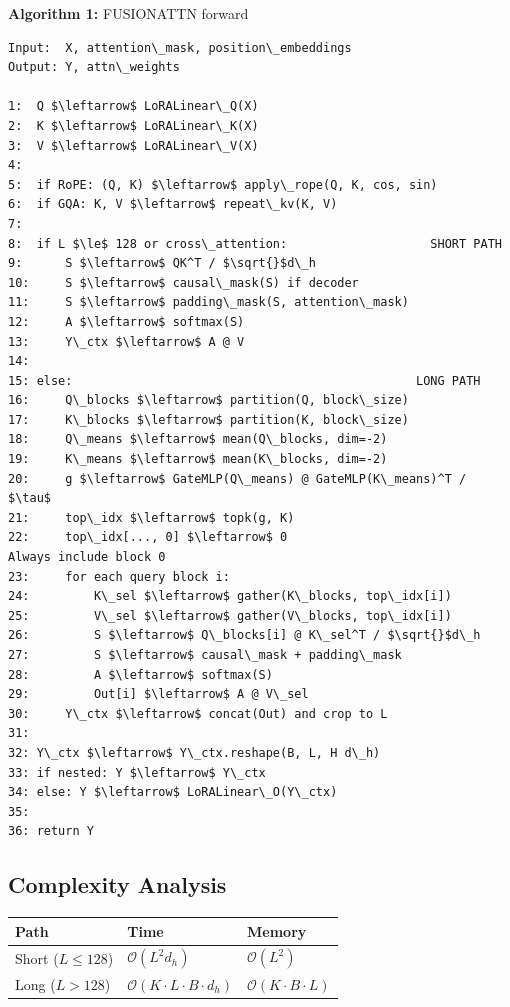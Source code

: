 \textbf{Algorithm 1:} FUSIONATTN forward
\begin{lstlisting}
Input:  X, attention\_mask, position\_embeddings
Output: Y, attn\_weights

1:  Q $\leftarrow$ LoRALinear\_Q(X)
2:  K $\leftarrow$ LoRALinear\_K(X)
3:  V $\leftarrow$ LoRALinear\_V(X)
4:
5:  if RoPE: (Q, K) $\leftarrow$ apply\_rope(Q, K, cos, sin)
6:  if GQA: K, V $\leftarrow$ repeat\_kv(K, V)
7:
8:  if L $\le$ 128 or cross\_attention:                    SHORT PATH
9:      S $\leftarrow$ QK^T / $\sqrt{}$d\_h
10:     S $\leftarrow$ causal\_mask(S) if decoder
11:     S $\leftarrow$ padding\_mask(S, attention\_mask)
12:     A $\leftarrow$ softmax(S)
13:     Y\_ctx $\leftarrow$ A @ V
14:
15: else:                                                LONG PATH
16:     Q\_blocks $\leftarrow$ partition(Q, block\_size)
17:     K\_blocks $\leftarrow$ partition(K, block\_size)
18:     Q\_means $\leftarrow$ mean(Q\_blocks, dim=-2)
19:     K\_means $\leftarrow$ mean(K\_blocks, dim=-2)
20:     g $\leftarrow$ GateMLP(Q\_means) @ GateMLP(K\_means)^T / $\tau$
21:     top\_idx $\leftarrow$ topk(g, K)
22:     top\_idx[..., 0] $\leftarrow$ 0                            Always include block 0
23:     for each query block i:
24:         K\_sel $\leftarrow$ gather(K\_blocks, top\_idx[i])
25:         V\_sel $\leftarrow$ gather(V\_blocks, top\_idx[i])
26:         S $\leftarrow$ Q\_blocks[i] @ K\_sel^T / $\sqrt{}$d\_h
27:         S $\leftarrow$ causal\_mask + padding\_mask
28:         A $\leftarrow$ softmax(S)
29:         Out[i] $\leftarrow$ A @ V\_sel
30:     Y\_ctx $\leftarrow$ concat(Out) and crop to L
31:
32: Y\_ctx $\leftarrow$ Y\_ctx.reshape(B, L, H d\_h)
33: if nested: Y $\leftarrow$ Y\_ctx
34: else: Y $\leftarrow$ LoRALinear\_O(Y\_ctx)
35:
36: return Y
\end{lstlisting}

\subsection{Complexity Analysis}

\begin{table}[H]
\centering
\small
\begin{tabular}{lll}
\toprule
\textbf{Path} & \textbf{Time} & \textbf{Memory} \\
\midrule
Short ($L \leq 128$) & $\mathcal{O}(L^2 d_h)$ & $\mathcal{O}(L^2)$ \\
Long ($L > 128$) & $\mathcal{O}(K \cdot L \cdot B \cdot d_h)$ & $\mathcal{O}(K \cdot B \cdot L)$ \\
\bottomrule
\end{tabular}
\end{table}


